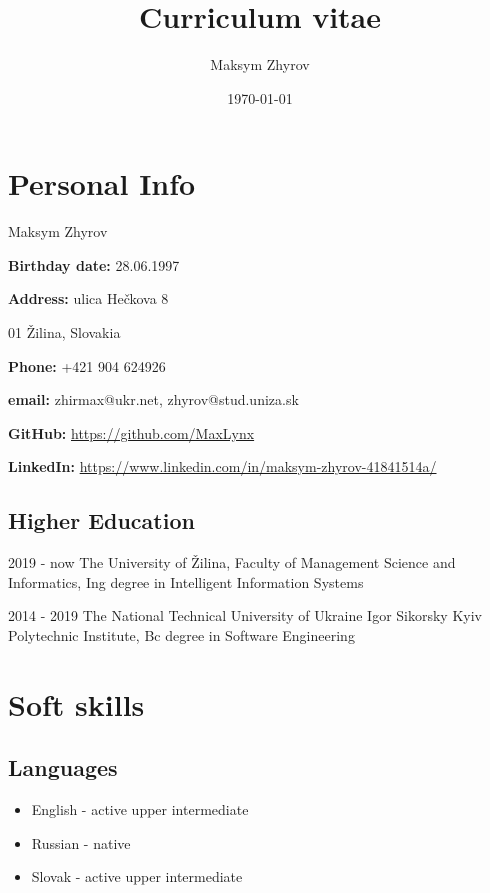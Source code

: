 \documentclass[a4paper,12pt]{article}
\author{Maksym Zhyrov}
\title{Curriculum vitae}
\date{\today}
\begin{document}
\section*{Personal Info}


{\Large Maksym Zhyrov}

\bigskip

\textbf{Birthday date:} 28.06.1997

\smallskip

\textbf{Address:} 
ulica Hečkova 8

\smallskip
\quad \quad \quad \quad {} 01 Žilina, 
Slovakia

\smallskip

\textbf{Phone:} +421 904 624926

\smallskip

\textbf{email:} 
zhirmax@ukr.net, 
zhyrov@stud.uniza.sk 

\smallskip

\textbf{GitHub:} \url{https://github.com/MaxLynx}

\smallskip

\textbf{LinkedIn:} \url{https://www.linkedin.com/in/maksym-zhyrov-41841514a/}

\subsection*{Higher Education}

2019 - now The University of Žilina,
Faculty of Management Science and Informatics,
Ing degree in Intelligent Information Systems

2014 - 2019 The National Technical University of Ukraine 
Igor Sikorsky Kyiv Polytechnic Institute,
Bc degree in Software Engineering

\section*{Soft skills}

\subsection*{Languages}

\begin{itemize}
    \item English - active upper intermediate
    \item Russian - native
    \item Slovak - active upper intermediate
\end{itemize}
\end{document}
